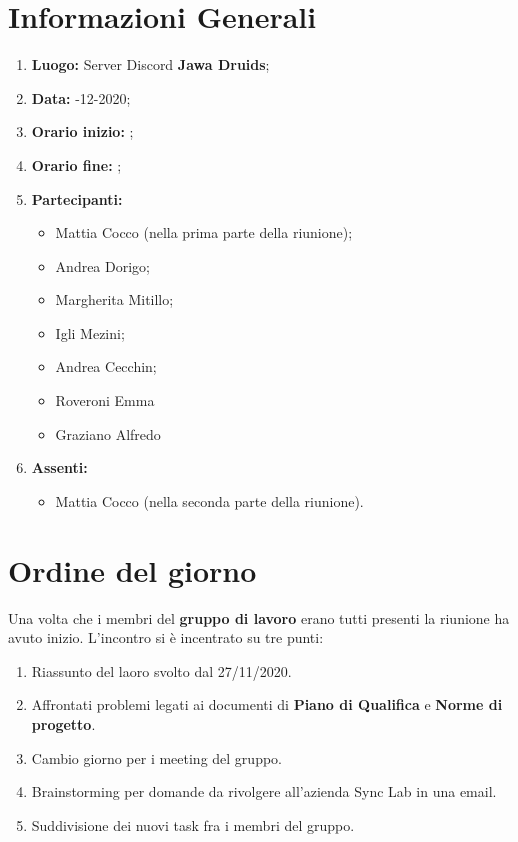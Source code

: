 \newpage
	\section{Informazioni Generali}
	\begin{enumerate}
		\item \textbf{Luogo:} \normalfont Server Discord \textbf{Jawa Druids};
		\item \textbf{Data:} -12-2020;
		\item \textbf{Orario inizio:} ;
		\item \textbf{Orario fine:} ;
		\item \textbf{Partecipanti:}
		\begin{itemize}
			\item Mattia Cocco (nella prima parte della riunione); 
			\item Andrea Dorigo;
			\item Margherita Mitillo;
			\item Igli Mezini;
			\item Andrea Cecchin;
			\item Roveroni Emma
			\item Graziano Alfredo\
		\end{itemize}
		\item \textbf{Assenti:}
		\begin{itemize}
			\item Mattia Cocco (nella seconda parte della riunione).
		\end{itemize}
	\end{enumerate}
	
	\section{Ordine del giorno}
	Una volta che i membri del \textbf{gruppo di lavoro} erano tutti presenti la riunione ha avuto inizio.
	L'incontro si è incentrato su tre punti:
	\begin{enumerate}
		\item Riassunto del laoro svolto dal 27/11/2020.
		
		\item Affrontati problemi legati ai documenti di \textbf{Piano di Qualifica} e \textbf{Norme di progetto}.
		
		\item Cambio giorno per i meeting del gruppo.
		
		\item Brainstorming per domande da rivolgere all'azienda Sync Lab in una email.
		
		\item Suddivisione dei nuovi task fra i membri del gruppo.
	\end{enumerate}
